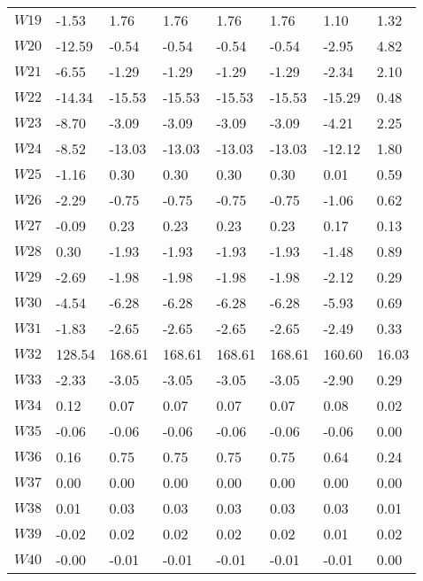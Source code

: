 \documentclass{article}
\begin{document}
\begin{longtable}{llllllll}
    $W19$    &   -1.53  & 1.76   & 1.76   & 1.76   & 1.76   & 1.10   & 1.32  \\
    $W20$    &   -12.59 & -0.54  & -0.54  & -0.54  & -0.54  & -2.95  & 4.82  \\
    $W21$    &   -6.55  & -1.29  & -1.29  & -1.29  & -1.29  & -2.34  & 2.10  \\
    $W22$    &   -14.34 & -15.53 & -15.53 & -15.53 & -15.53 & -15.29 & 0.48  \\
    $W23$    &   -8.70  & -3.09  & -3.09  & -3.09  & -3.09  & -4.21  & 2.25  \\
    $W24$    &   -8.52  & -13.03 & -13.03 & -13.03 & -13.03 & -12.12 & 1.80  \\
    $W25$    &   -1.16  & 0.30   & 0.30   & 0.30   & 0.30   & 0.01   & 0.59  \\
    $W26$    &   -2.29  & -0.75  & -0.75  & -0.75  & -0.75  & -1.06  & 0.62  \\
    $W27$    &   -0.09  & 0.23   & 0.23   & 0.23   & 0.23   & 0.17   & 0.13  \\
    $W28$    &   0.30   & -1.93  & -1.93  & -1.93  & -1.93  & -1.48  & 0.89  \\
    $W29$    &   -2.69  & -1.98  & -1.98  & -1.98  & -1.98  & -2.12  & 0.29  \\
    $W30$    &   -4.54  & -6.28  & -6.28  & -6.28  & -6.28  & -5.93  & 0.69  \\
    $W31$    &   -1.83  & -2.65  & -2.65  & -2.65  & -2.65  & -2.49  & 0.33  \\
    $W32$    &   128.54 & 168.61 & 168.61 & 168.61 & 168.61 & 160.60 & 16.03 \\
    $W33$    &   -2.33  & -3.05  & -3.05  & -3.05  & -3.05  & -2.90  & 0.29  \\
    $W34$    &   0.12   & 0.07   & 0.07   & 0.07   & 0.07   & 0.08   & 0.02  \\
    $W35$    &   -0.06  & -0.06  & -0.06  & -0.06  & -0.06  & -0.06  & 0.00  \\
    $W36$    &   0.16   & 0.75   & 0.75   & 0.75   & 0.75   & 0.64   & 0.24  \\
    $W37$    &   0.00   & 0.00   & 0.00   & 0.00   & 0.00   & 0.00   & 0.00  \\
    $W38$    &   0.01   & 0.03   & 0.03   & 0.03   & 0.03   & 0.03   & 0.01  \\
    $W39$    &   -0.02  & 0.02   & 0.02   & 0.02   & 0.02   & 0.01   & 0.02  \\
    $W40$    &   -0.00  & -0.01  & -0.01  & -0.01  & -0.01  & -0.01  & 0.00  \\

\end{longtable}
\end{document}
